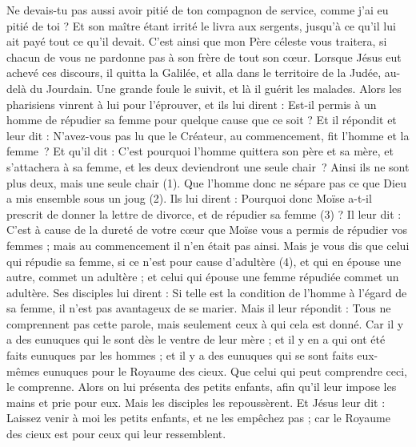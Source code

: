 \begin{multicols}{2}
{Ne devais-tu pas aussi avoir pitié de ton compagnon de service, comme j’ai eu pitié de toi ?
Et son maître étant irrité le livra aux sergents, jusqu'à ce qu'il lui ait payé tout ce qu’il devait.
C'est ainsi que mon Père céleste vous traitera, si chacun de vous ne pardonne pas à son frère de tout son cœur.
\VerseOne{}Lorsque Jésus eut achevé ces discours, il quitta la Galilée, et alla dans le territoire de la Judée, au-delà du Jourdain.
Une grande foule le suivit, et là il guérit les malades.
Alors les pharisiens vinrent à lui pour l'éprouver, et ils lui dirent : Est-il permis à un homme de répudier sa femme pour quelque cause que ce soit ?
Et il répondit et leur dit : N'avez-vous pas lu que le Créateur, au commencement, fit l’homme et la femme ?
Et qu'il dit : C’est pourquoi l'homme quittera son père et sa mère, et s’attachera à sa femme, et les deux deviendront une seule chair ?
Ainsi ils ne sont plus deux, mais une seule chair (1). Que l’homme donc ne sépare pas ce que Dieu a mis ensemble sous un joug (2).
Ils lui dirent : Pourquoi donc Moïse a-t-il prescrit de donner la lettre de divorce, et de répudier sa femme (3) ?
Il leur dit : C'est à cause de la dureté de votre cœur que Moïse vous a permis de répudier vos femmes ; mais au commencement il n'en était pas ainsi.
Mais je vous dis que celui qui répudie sa femme, si ce n'est pour cause d'adultère (4), et qui en épouse une autre, commet un adultère ; et celui qui épouse une femme répudiée commet un adultère.
Ses disciples lui dirent : Si telle est la condition de l'homme à l'égard de sa femme, il n’est pas avantageux de se marier.
Mais il leur répondit : Tous ne comprennent pas cette parole, mais seulement ceux à qui cela est donné.
Car il y a des eunuques qui le sont dès le ventre de leur mère ; et il y en a qui ont été faits eunuques par les hommes ; et il y a des eunuques qui se sont faits eux-mêmes eunuques pour le Royaume des cieux. Que celui qui peut comprendre ceci, le comprenne.
Alors on lui présenta des petits enfants, afin qu'il leur impose les mains et prie pour eux. Mais les disciples les repoussèrent.
Et Jésus leur dit : Laissez venir à moi les petits enfants, et ne les empêchez pas ; car le Royaume des cieux est pour ceux qui leur ressemblent.
}
\end{multicols}
